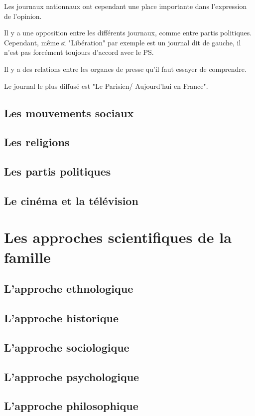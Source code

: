 \documentclass[12pt, a4paper, openany]{book}
\begin{document}
Les journaux nationnaux ont cependant une place importante dans l'expression de l'opinion. 

Il y a une opposition entre les différents journaux, comme entre partis politiques. Cependant, même si "Libération" par exemple est un journal dit de gauche, il n'est pas forcément toujours d'accord avec le PS. 

Il y a des relations entre les organes de presse qu'il faut essayer de comprendre.

Le journal le plus diffusé est "Le Parisien/ Aujourd'hui en France". 

\chapter{Les mouvements sociaux}

\chapter{Les religions}

\chapter{Les partis politiques}

\chapter{Le cinéma et la télévision}


\part{Les approches scientifiques de la famille}

\chapter{L'approche ethnologique}

\chapter{L'approche historique}

\chapter{L'approche sociologique}

\chapter{L'approche psychologique}

\chapter{L'approche philosophique}
\end{document}
